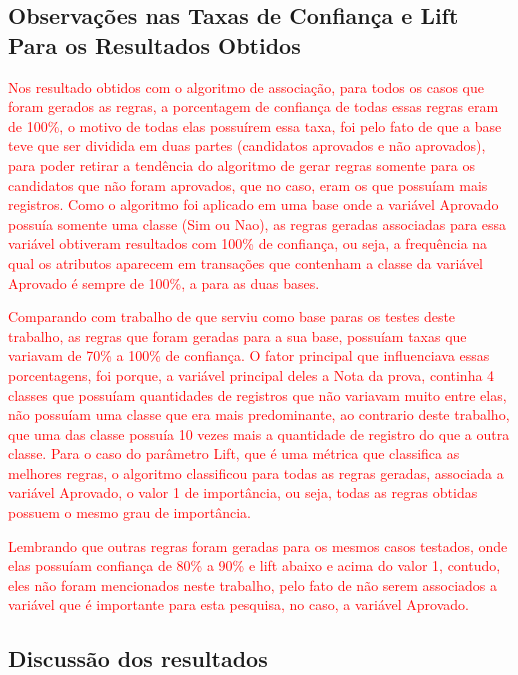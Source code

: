 \subsection{Observações nas Taxas de Confiança e Lift Para os Resultados Obtidos}

\par
\textcolor{red}{Nos resultado obtidos com o algoritmo de associação, para todos os casos que foram gerados as regras, a porcentagem de confiança de todas essas regras eram de 100\%, o motivo de todas elas possuírem essa taxa, foi pelo fato de que a base teve que ser dividida em duas partes (candidatos aprovados e não aprovados), para poder retirar a tendência  do algoritmo de gerar regras somente para os candidatos que não foram aprovados, que no caso, eram os que possuíam mais registros. Como o algoritmo foi aplicado em uma base onde a variável Aprovado possuía somente uma classe (Sim ou Nao), as regras geradas associadas para essa variável obtiveram resultados com 100\% de confiança, ou seja, a frequência na qual os atributos aparecem em transações que contenham a classe da variável Aprovado é sempre de 100\%, a para as duas bases. }

\par
\textcolor{red}{Comparando com trabalho de  que serviu como base paras os testes deste trabalho, as regras que foram geradas para a sua base, possuíam taxas que variavam de 70\% a 100\% de confiança. O fator principal que influenciava essas porcentagens, foi porque, a variável principal deles a Nota da prova, continha 4 classes que possuíam quantidades de registros que não variavam muito entre elas, não possuíam uma classe que era mais predominante, ao contrario deste trabalho, que uma das classe possuía 10 vezes mais a quantidade de registro do que a outra classe. Para o caso do parâmetro Lift, que é uma métrica que classifica as melhores regras, o algoritmo classificou para todas as regras geradas, associada a variável Aprovado, o valor 1 de importância, ou seja, todas as regras obtidas possuem o mesmo grau de importância.}

\par
\textcolor{red}{Lembrando que outras regras foram geradas para os mesmos casos testados, onde elas possuíam confiança de 80\% a 90\% e lift abaixo e acima do valor 1, contudo, eles não foram mencionados neste trabalho, pelo fato de não serem associados a variável que é importante para esta pesquisa, no caso, a variável Aprovado.}

\subsection{Discussão dos resultados}

